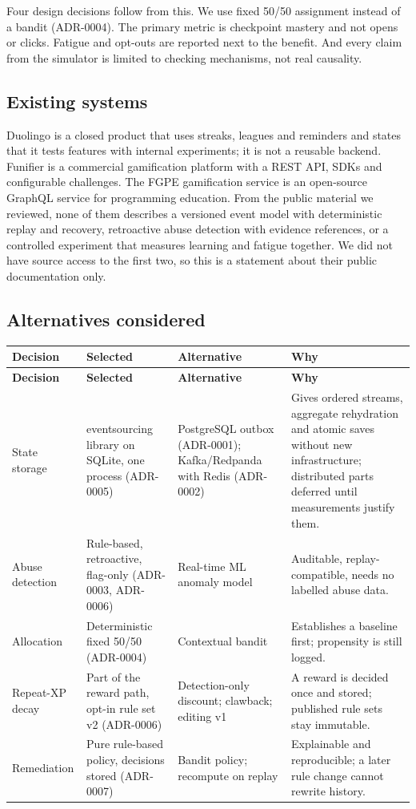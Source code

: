 \documentclass[11pt,a4paper]{article}
\newcommand{\hdr}[1]{\textbf{\color{white}\sffamily\small #1}}
\renewcommand{\_}{\textunderscore\allowbreak{}}
\begin{document}
Four design decisions follow from this. We use fixed 50/50 assignment instead of a bandit (ADR-0004). The primary metric is checkpoint mastery and not opens or clicks. Fatigue and opt-outs are reported next to the benefit. And every claim from the simulator is limited to checking mechanisms, not real causality.

\subsection{Existing systems}

Duolingo is a closed product that uses streaks, leagues and reminders and states that it tests features with internal experiments; it is not a reusable backend. Funifier is a commercial gamification platform with a REST API, SDKs and configurable challenges. The FGPE gamification service is an open-source GraphQL service for programming education. From the public material we reviewed, none of them describes a versioned event model with deterministic replay and recovery, retroactive abuse detection with evidence references, or a controlled experiment that measures learning and fatigue together. We did not have source access to the first two, so this is a statement about their public documentation only.

\subsection{Alternatives considered}

\begin{xltabular}{\textwidth}{@{}L{2.5cm} L{3.4cm} L{3.4cm} Y@{}}
 \hdr{Decision} & \hdr{Selected} & \hdr{Alternative} & \hdr{Why} \\
\endfirsthead
{} \hdr{Decision} & \hdr{Selected} & \hdr{Alternative} & \hdr{Why} \\
\endhead
{} State storage & eventsourcing library on SQLite, one process (ADR-0005) & PostgreSQL outbox (ADR-0001); Kafka/Redpanda with Redis (ADR-0002) & Gives ordered streams, aggregate rehydration and atomic saves without new infrastructure; distributed parts deferred until measurements justify them. \\
Abuse detection & Rule-based, retroactive, flag-only (ADR-0003, ADR-0006) & Real-time ML anomaly model & Auditable, replay-compatible, needs no labelled abuse data. \\
 Allocation & Deterministic fixed 50/50 (ADR-0004) & Contextual bandit & Establishes a baseline first; propensity is still logged. \\
Repeat-XP decay & Part of the reward path, opt-in rule set v2 (ADR-0006) & Detection-only discount; clawback; editing v1 & A reward is decided once and stored; published rule sets stay immutable. \\
 Remediation & Pure rule-based policy, decisions stored (ADR-0007) & Bandit policy; recompute on replay & Explainable and reproducible; a later rule change cannot rewrite history. \\
\end{xltabular}
\end{document}
